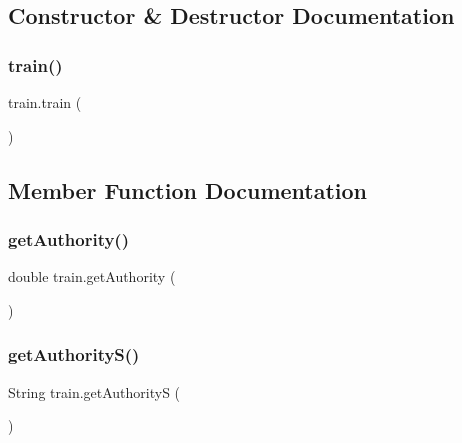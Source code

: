 \subsection{Constructor \& Destructor Documentation}
\mbox{\label{classtrain_ab59e6329c64e077e362640c3c1efd4e3}} 
\subsubsection{\texorpdfstring{train()}{train()}}
{\footnotesize\ttfamily train.\+train (\begin{DoxyParamCaption}{ }\end{DoxyParamCaption})}



\subsection{Member Function Documentation}
\mbox{\label{classtrain_adaa613d6d0407c1bc75286433ee4492c}} 
\subsubsection{\texorpdfstring{get\+Authority()}{getAuthority()}}
{\footnotesize\ttfamily double train.\+get\+Authority (\begin{DoxyParamCaption}{ }\end{DoxyParamCaption})}

\mbox{\label{classtrain_ae60270a74c0afa8710a412d9ddb5c512}} 
\subsubsection{\texorpdfstring{get\+Authority\+S()}{getAuthorityS()}}
{\footnotesize\ttfamily String train.\+get\+AuthorityS (\begin{DoxyParamCaption}{ }\end{DoxyParamCaption})}

\mbox{\label{classtrain_a1e506c38b86f07589e8ebe433674d7db}} 
